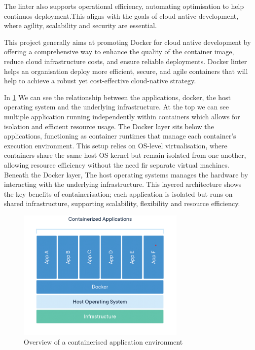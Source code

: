 The linter also supports operational efficiency, automating optimisation to help continuos deployment.This aligns with the goals of cloud native development, where agility, scalability and security are essential. 

This project generally aims at promoting Docker for cloud native development by offering a comprehensive way to enhance the quality of the container image, reduce cloud infrastructure costs, and ensure reliable deployments. Docker linter helps an organisation deploy more efficient, secure, and agile containers that will help to achieve a robust yet cost-effective cloud-native strategy. 

In \ref{fig:2.3} We can see the relationship between the applications, docker, the host operating system and the underlying infrastructure. At the top we can see multiple application running independently within containers which allows for isolation and efficient resource usage. 
The Docker layer sits below the applications, functioning as container runtimes that manage each container's execution environment. This setup relies on OS-level virtualisation, where containers share the same host OS kernel but remain isolated from one another, allowing resource efficiency without the need fir separate virtual machines. 
Beneath the Docker layer, The host operating systems manages the hardware by interacting with the underlying infrastructure.
This layered architecture shows the key benefits of containerisation; each application is isolated but runs on shared infrastructure, supporting scalability, flexibility and resource efficiency. 
\begin{figure}[ht]
  \centering
  \includegraphics[width=0.73\textwidth]{Figures/container_diagram.png}
  \caption{Overview of a containerised application environment \cite{docker_cont}} %
  \label{fig:2.3} %
\end{figure}

